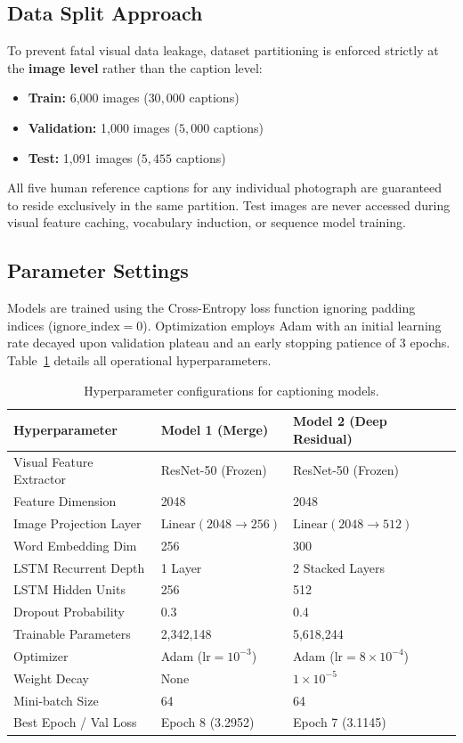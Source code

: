 \documentclass[10pt,conference,a4paper]{IEEEtran}
\begin{document}
\subsection{Data Split Approach}
To prevent fatal visual data leakage, dataset partitioning is enforced strictly at the \textbf{image level} rather than the caption level:
\begin{itemize}
    \item \textbf{Train:} 6,000 images ($30{,}000$ captions)
    \item \textbf{Validation:} 1,000 images ($5{,}000$ captions)
    \item \textbf{Test:} 1,091 images ($5{,}455$ captions)
\end{itemize}
All five human reference captions for any individual photograph are guaranteed to reside exclusively in the same partition. Test images are never accessed during visual feature caching, vocabulary induction, or sequence model training.

\subsection{Parameter Settings}
Models are trained using the Cross-Entropy loss function ignoring padding indices ($\text{ignore\_index}=0$). Optimization employs Adam with an initial learning rate decayed upon validation plateau and an early stopping patience of 3 epochs. Table~\ref{tab:hyperparams} details all operational hyperparameters.

\begin{table}[htbp]
\centering
\caption{Hyperparameter configurations for captioning models.}
\label{tab:hyperparams}
\begin{tabular}{lll}
\toprule
\textbf{Hyperparameter} & \textbf{Model 1 (Merge)} & \textbf{Model 2 (Deep Residual)} \\
\midrule
Visual Feature Extractor & ResNet-50 (Frozen) & ResNet-50 (Frozen) \\
Feature Dimension & 2048 & 2048 \\
Image Projection Layer & $\text{Linear}(2048 \to 256)$ & $\text{Linear}(2048 \to 512)$ \\
Word Embedding Dim & 256 & 300 \\
LSTM Recurrent Depth & 1 Layer & 2 Stacked Layers \\
LSTM Hidden Units & 256 & 512 \\
Dropout Probability & 0.3 & 0.4 \\
Trainable Parameters & 2,342,148 & 5,618,244 \\
Optimizer & Adam ($\text{lr}=10^{-3}$) & Adam ($\text{lr}=8 \times 10^{-4}$) \\
Weight Decay & None & $1 \times 10^{-5}$ \\
Mini-batch Size & 64 & 64 \\
Best Epoch / Val Loss & Epoch 8 (3.2952) & Epoch 7 (3.1145) \\
\bottomrule
\end{tabular}
\end{table}
\end{document}
